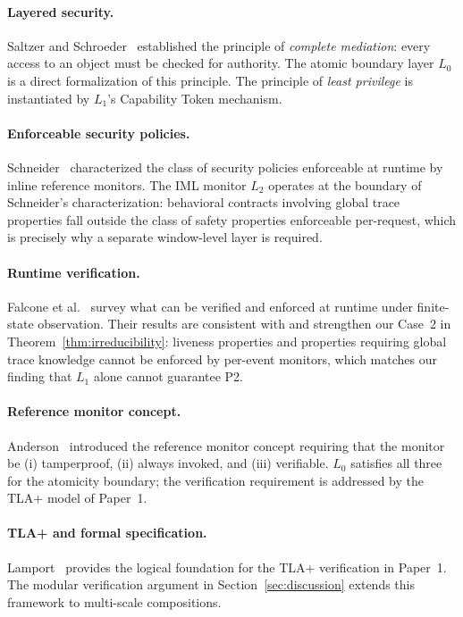 \documentclass[11pt]{article}
\newcommand{\Layer}[1]{L_{#1}}
\begin{document}
\paragraph{Layered security.}
Saltzer and Schroeder~\cite{saltzer1975} established the principle of
\emph{complete mediation}: every access to an object must be checked for
authority. The atomic boundary layer $\Layer{0}$ is a direct formalization of
this principle. The principle of \emph{least privilege} is instantiated by
$\Layer{1}$'s Capability Token mechanism.

\paragraph{Enforceable security policies.}
Schneider~\cite{schneider2000} characterized the class of security policies
enforceable at runtime by inline reference monitors. The IML monitor
$\Layer{2}$ operates at the boundary of Schneider's characterization:
behavioral contracts involving global trace properties fall outside the
class of safety properties enforceable per-request, which is precisely why a
separate window-level layer is required.

\paragraph{Runtime verification.}
Falcone et al.~\cite{falcone2012} survey what can be verified and enforced at
runtime under finite-state observation. Their results are consistent with and
strengthen our Case~2 in Theorem~\ref{thm:irreducibility}: liveness
properties and properties requiring global trace knowledge cannot be enforced
by per-event monitors, which matches our finding that $\Layer{1}$ alone cannot
guarantee P2.

\paragraph{Reference monitor concept.}
Anderson~\cite{anderson1972} introduced the reference monitor concept requiring
that the monitor be (i) tamperproof, (ii) always invoked, and (iii) verifiable.
$\Layer{0}$ satisfies all three for the atomicity boundary; the verification
requirement is addressed by the TLA+ model of Paper~1.

\paragraph{TLA+ and formal specification.}
Lamport~\cite{lamport2002} provides the logical foundation for the TLA+
verification in Paper~1. The modular verification argument in
Section~\ref{sec:discussion} extends this framework to multi-scale
compositions.
\end{document}
